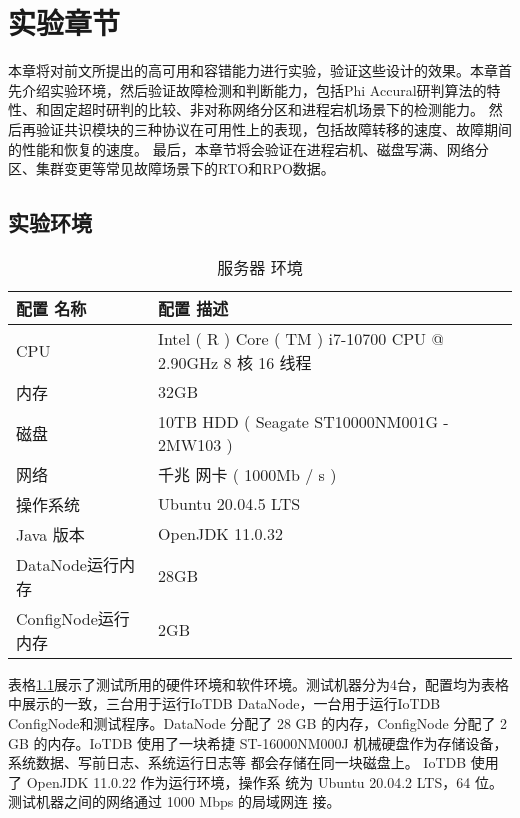 
\chapter{实验章节}

本章将对前文所提出的高可用和容错能力进行实验，验证这些设计的效果。本章首先介绍实验环境，然后验证故障检测和判断能力，包括Phi Accural研判算法的特性、和固定超时研判的比较、非对称网络分区和进程宕机场景下的检测能力。
然后再验证共识模块的三种协议在可用性上的表现，包括故障转移的速度、故障期间的性能和恢复的速度。
最后，本章节将会验证在进程宕机、磁盘写满、网络分区、集群变更等常见故障场景下的RTO和RPO数据。


\section{实验环境}


\begin{table}[h!]
    \centering
    \caption{服务器 环境}
    \label{tab:server_environment}
    \begin{tabular}{ll}
        \toprule
        配置 名称 & 配置 描述 \\
        \midrule
        CPU & Intel ( R ) Core ( TM ) i7-10700 CPU @ 2.90GHz 8 核 16 线程 \\
        内存 & 32GB \\
        磁盘 & 10TB HDD ( Seagate ST10000NM001G - 2MW103 ) \\
        网络 & 千兆 网卡 ( 1000Mb / s ) \\
        操作系统 & Ubuntu 20.04.5 LTS \\
        Java 版本 & OpenJDK 11.0.32 \\
        DataNode运行内存 & 28GB \\
        ConfigNode运行内存 & 2GB \\
        \bottomrule
    \end{tabular}
\end{table}

表格\ref{tab:server_environment}展示了测试所用的硬件环境和软件环境。测试机器分为4台，配置均为表格中展示的一致，三台用于运行IoTDB DataNode，一台用于运行IoTDB ConfigNode和测试程序。DataNode
分配了 28 GB 的内存，ConfigNode 分配了 2 GB 的内存。IoTDB 使用了一块希捷
ST-16000NM000J 机械硬盘作为存储设备，系统数据、写前日志、系统运行日志等
都会存储在同一块磁盘上。 IoTDB 使用了 OpenJDK 11.0.22 作为运行环境，操作系
统为 Ubuntu 20.04.2 LTS，64 位。测试机器之间的网络通过 1000 Mbps 的局域网连
接。

